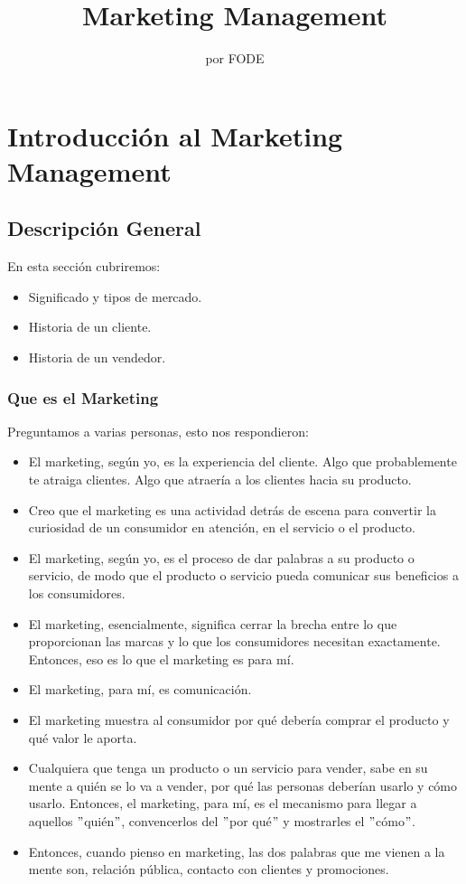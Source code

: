 \documentclass[10pt]{book}
\begin{document}
\normalfont

\author{\Large por FODE}
\title{Marketing Management}
\date{}
\pagestyle{empty}
\maketitle
\thispagestyle{empty}
\let\cleardoublepage\clearpage
\tableofcontents 								%

 
\let\cleardoublepage\clearpage

\chapter{Introducción al Marketing Management}
\section{Descripción General}
En esta sección cubriremos:
\begin{itemize}
\item Significado y tipos de mercado.
\item Historia de un cliente.
\item Historia de un vendedor.
\end{itemize}
\subsection{Que es el Marketing}
Preguntamos a varias personas, esto nos respondieron:
\begin{itemize}
\item El marketing, según yo, es la experiencia del cliente. Algo que probablemente te atraiga clientes. Algo que atraería a los clientes hacia su producto.
\item Creo que el marketing es una actividad detrás de escena para convertir la curiosidad de un consumidor en atención, en el servicio o el producto.
\item El marketing, según yo, es el proceso de dar palabras a su producto o servicio, de modo que el producto o servicio pueda comunicar sus beneficios a los consumidores.
\item El marketing, esencialmente, significa cerrar la brecha entre lo que proporcionan las marcas y lo que los consumidores necesitan exactamente. Entonces, eso es lo que el marketing es para mí.
\item El marketing, para mí, es comunicación.
\item El marketing muestra al consumidor por qué debería comprar el producto y qué valor le aporta.
\item Cualquiera que tenga un producto o un servicio para vender, sabe en su mente a quién se lo va a vender, por qué las personas deberían usarlo y cómo usarlo. Entonces, el marketing, para mí, es el mecanismo para llegar a aquellos $"$quién$"$, convencerlos del $"$por qué$"$ y mostrarles el $"$cómo$"$.
\item Entonces, cuando pienso en marketing, las dos palabras que me vienen a la mente son, relación pública, contacto con clientes y promociones.
\end{itemize}
\end{document}
